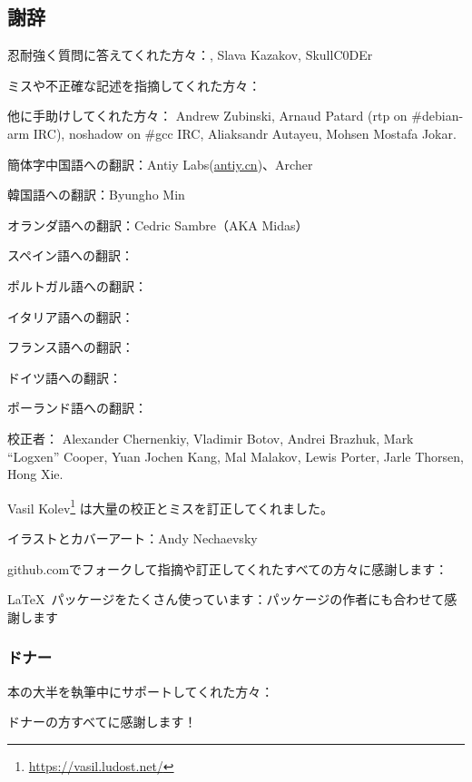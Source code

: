 \subsection*{謝辞}

忍耐強く質問に答えてくれた方々：\HERMIT, Slava  Kazakov, SkullC0DEr

ミスや不正確な記述を指摘してくれた方々：\PeopleMistakesInaccuracies{}

他に手助けしてくれた方々：
Andrew Zubinski,
Arnaud Patard (rtp on \#debian-arm IRC),
noshadow on \#gcc IRC,
Aliaksandr Autayeu,
Mohsen Mostafa Jokar.

簡体字中国語への翻訳：Antiy Labs(\href{http://antiy.cn}{antiy.cn})、Archer

韓国語への翻訳：Byungho Min

オランダ語への翻訳：Cedric Sambre（AKA Midas）

スペイン語への翻訳： \PeopleSpanishTranslators{}

ポルトガル語への翻訳：\PeoplePTBRTranslators{}

イタリア語への翻訳：\PeopleItalianTranslators{}

フランス語への翻訳：\PeopleFrenchTranslators{}

ドイツ語への翻訳：\PeopleGermanTranslators{}

ポーランド語への翻訳：\PeoplePolishTranslators{}

校正者：
Alexander  Chernenkiy,
Vladimir Botov,
Andrei Brazhuk,
Mark ``Logxen'' Cooper, Yuan Jochen Kang, Mal Malakov, Lewis Porter, Jarle Thorsen, Hong Xie.

Vasil Kolev\footnote{\url{https://vasil.ludost.net/}} は大量の校正とミスを訂正してくれました。

イラストとカバーアート：Andy Nechaevsky

github.comでフォークして指摘や訂正してくれたすべての方々に感謝します：\FNGithubContributors{}

\LaTeX\ パッケージをたくさん使っています：パッケージの作者にも合わせて感謝します

\subsubsection*{ドナー}

本の大半を執筆中にサポートしてくれた方々：



ドナーの方すべてに感謝します！

